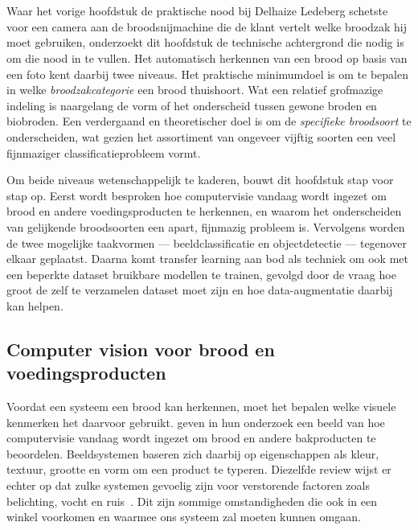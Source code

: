 \chapter{}%
\label{ch:stand-van-zaken}


Waar het vorige hoofdstuk de praktische nood bij Delhaize Ledeberg schetste voor een
camera aan de broodsnijmachine die de klant vertelt welke broodzak hij moet
gebruiken, onderzoekt dit hoofdstuk de technische achtergrond die nodig is om die
nood in te vullen. Het automatisch herkennen van een brood op basis van
een foto kent daarbij twee niveaus. Het praktische minimumdoel is om te bepalen in
welke \emph{broodzakcategorie} een brood thuishoort. Wat een relatief grofmazige
indeling is naargelang de vorm of het onderscheid tussen gewone broden en
biobroden. Een verdergaand en theoretischer doel is om de \emph{specifieke broodsoort}
te onderscheiden, wat gezien het assortiment van ongeveer vijftig soorten een veel fijnmaziger classificatieprobleem vormt.


Om beide niveaus wetenschappelijk te kaderen, bouwt dit hoofdstuk stap voor stap op.
Eerst wordt besproken hoe computervisie vandaag wordt ingezet om brood en andere
voedingsproducten te herkennen, en waarom het onderscheiden van gelijkende
broodsoorten een apart, fijnmazig probleem is. Vervolgens worden de twee mogelijke
taakvormen --- beeldclassificatie en objectdetectie --- tegenover elkaar geplaatst.
Daarna komt transfer learning aan bod als techniek om ook met een beperkte dataset
bruikbare modellen te trainen, gevolgd door de vraag hoe groot de zelf te verzamelen
dataset moet zijn en hoe data-augmentatie daarbij kan helpen.


\section{Computer vision voor brood en voedingsproducten}


Voordat een systeem een brood kan herkennen, moet het bepalen welke visuele kenmerken
het daarvoor gebruikt. \textcite{Olakanmi2023} geven in hun onderzoek een
beeld van hoe computervisie vandaag wordt ingezet om brood en andere bakproducten te
beoordelen. Beeldsystemen baseren zich daarbij op eigenschappen als kleur, textuur,
grootte en vorm om een product te typeren. Diezelfde review wijst er echter op dat
zulke systemen gevoelig zijn voor verstorende factoren zoals belichting, vocht en
ruis~\autocite{Olakanmi2023}. Dit zijn sommige omstandigheden die ook in een winkel voorkomen en waarmee ons systeem zal moeten kunnen omgaan.


